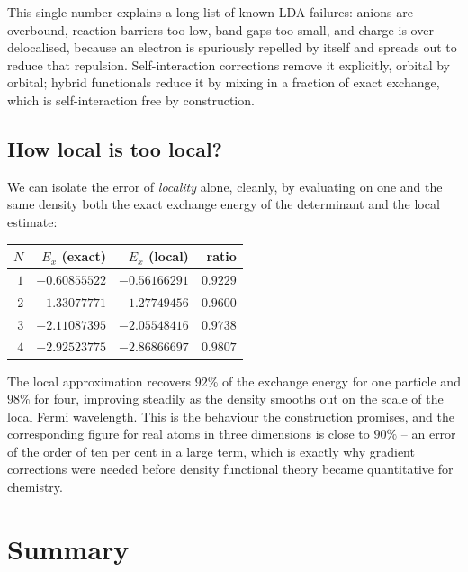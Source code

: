 This single number explains a long list of known LDA failures: anions are
overbound, reaction barriers too low, band gaps too small, and charge is
over-delocalised, because an electron is spuriously repelled by itself and
spreads out to reduce that repulsion.  Self-interaction corrections remove it
explicitly, orbital by orbital; hybrid functionals reduce it by mixing in a
fraction of exact exchange, which is self-interaction free by construction.

\subsection{How local is too local?}
\label{sec:howlocal}

We can isolate the error of \emph{locality} alone, cleanly, by evaluating on
one and the same density both the exact exchange energy of the determinant
and the local estimate:

\begin{center}
\renewcommand{\arraystretch}{1.2}
\setlength{\tabcolsep}{11pt}
\begin{tabular}{rrrr}
\toprule
$N$ & $E_x$ (exact) & $E_x$ (local) & ratio\\
\midrule
$1$ & $-0.60855522$ & $-0.56166291$ & $0.9229$\\
$2$ & $-1.33077771$ & $-1.27749456$ & $0.9600$\\
$3$ & $-2.11087395$ & $-2.05548416$ & $0.9738$\\
$4$ & $-2.92523775$ & $-2.86866697$ & $0.9807$\\
\bottomrule
\end{tabular}
\end{center}

The local approximation recovers $92\%$ of the exchange energy for one
particle and $98\%$ for four, improving steadily as the density smooths out
on the scale of the local Fermi wavelength.  This is the behaviour the
construction promises, and the corresponding figure for real atoms in three
dimensions is close to $90\%$ -- an error of the order of ten per cent in a
large term, which is exactly why gradient corrections were needed before
density functional theory became quantitative for chemistry.

\section{Summary}
\label{sec:ch8summary}

